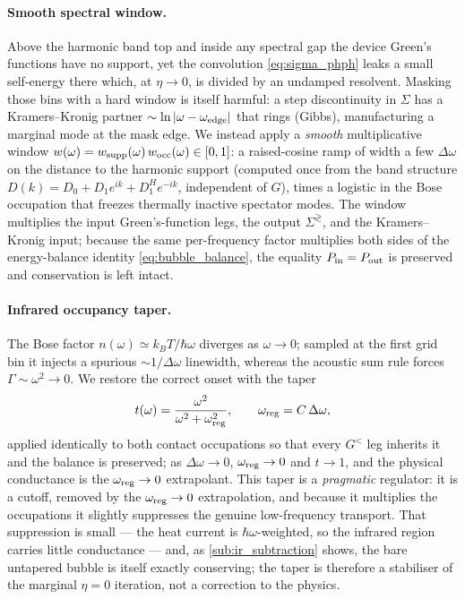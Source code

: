 \paragraph{Smooth spectral window.}
Above the harmonic band top and inside any spectral gap the device Green's
functions have no support, yet the convolution \cref{eq:sigma_phph} leaks a small
self-energy there which, at $\eta\to0$, is divided by an undamped resolvent.
Masking those bins with a hard window is itself harmful: a step discontinuity in
$\Sigma$ has a Kramers--Kronig partner $\sim\ln|\omega-\omega_{\rm edge}|$ that
rings (Gibbs), manufacturing a marginal mode at the mask edge. We instead apply a
\emph{smooth} multiplicative window
$w(\omega)=w_{\rm supp}(\omega)\,w_{\rm occ}(\omega)\in[0,1]$: a raised-cosine
ramp of width a few $\Delta\omega$ on the distance to the harmonic support
(computed once from the band structure $D(k)=D_0+D_1e^{ik}+D_1^{H}e^{-ik}$,
independent of $G$), times a logistic in the Bose occupation that freezes
thermally inactive spectator modes. The window multiplies the input
Green's-function legs, the output $\Sigma^{\gtrless}$, and the Kramers--Kronig
input; because the same per-frequency factor multiplies both sides of the
energy-balance identity \cref{eq:bubble_balance}, the equality
$P_{\rm in}=P_{\rm out}$ is preserved and conservation is left intact.

\paragraph{Infrared occupancy taper.}
The Bose factor $n(\omega)\simeq k_BT/\hbar\omega$ diverges as $\omega\to0$;
sampled at the first grid bin it injects a spurious $\sim 1/\Delta\omega$
linewidth, whereas the acoustic sum rule forces $\Gamma\sim\omega^2\to0$. We
restore the correct onset with the taper
\begin{equation}\label{eq:ir_taper}
  t(\omega)=\frac{\omega^2}{\omega^2+\omega_{\rm reg}^2},
  \qquad\omega_{\rm reg}=C\,\Delta\omega,
\end{equation}
applied identically to both contact occupations so that every $G^<$ leg inherits
it and the balance is preserved; as $\Delta\omega\to0$, $\omega_{\rm reg}\to0$ and
$t\to1$, and the physical conductance is the $\omega_{\rm reg}\to0$ extrapolant.
This taper is a \emph{pragmatic} regulator: it is a cutoff, removed by the
$\omega_{\rm reg}\to0$ extrapolation, and because it multiplies the occupations it
slightly suppresses the genuine low-frequency transport. That suppression is small
--- the heat current is $\hbar\omega$-weighted, so the infrared region carries
little conductance --- and, as \cref{sub:ir_subtraction} shows, the bare untapered
bubble is itself exactly conserving; the taper is therefore a stabiliser of the
marginal $\eta=0$ iteration, not a correction to the physics.

